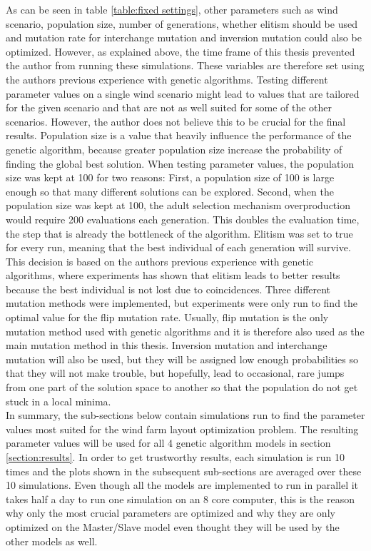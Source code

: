\noindent As can be seen in table \ref{table:fixed settings}, other parameters such as wind scenario, population size, number of generations, whether elitism should be used and mutation rate for interchange mutation and inversion mutation could also be optimized. However, as explained above, the time frame of this thesis prevented the author from running these simulations. These variables are therefore set using the authors previous experience with genetic algorithms. Testing different parameter values on a single wind scenario might lead to values that are tailored for the given scenario and that are not as well suited for some of the other scenarios. However, the author does not believe this to be crucial for the final results. Population size is a value that heavily influence the performance of the genetic algorithm, because greater population size increase the probability of finding the global best solution. When testing parameter values, the population size was kept at 100 for two reasons: First, a population size of 100 is large enough so that many different solutions can be explored. Second, when the population size was kept at 100, the adult selection mechanism overproduction would require 200 evaluations each generation. This doubles the evaluation time, the step that is already the bottleneck of the algorithm. Elitism was set to true for every run, meaning that the best individual of each generation will survive. This decision is based on the authors previous experience with genetic algorithms, where experiments has shown that elitism leads to better results because the best individual is not lost due to coincidences. Three different mutation methods were implemented, but experiments were only run to find the optimal value for the flip mutation rate. Usually, flip mutation is the only mutation method used with genetic algorithms and it is therefore also used as the main mutation method in this thesis. Inversion mutation and interchange mutation will also be used, but they will be assigned low enough probabilities so that they will not make trouble, but hopefully, lead to occasional, rare jumps from one part of the solution space to another so that the population do not get stuck in a local minima.\\

\noindent In summary, the sub-sections below contain simulations run to find the parameter values most suited for the wind farm layout optimization problem. The resulting parameter values will be used for all 4 genetic algorithm models in section \ref{section:results}. In order to get trustworthy results, each simulation is run 10 times and the plots shown in the subsequent sub-sections are averaged over these 10 simulations. Even though all the models are implemented to run in parallel it takes half a day to run one simulation on an 8 core computer, this is the reason why only the most crucial parameters are optimized and why they are only optimized on the Master/Slave model even thought they will be used by the other models as well.\\

